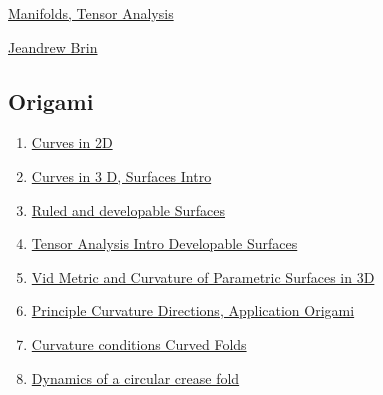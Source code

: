 \documentclass[11pt]{article}
\begin{document}
	\kaishu 
	\setcounter{section}{0}
	\begin{center}
		{\LARGE  \href{https://www.ideas4africa.co.za/manifolds}{Manifolds, Tensor Analysis}}
		
		\vspace{-0.25cm}
		
		{\large \href{https://www.ideas4africa.co.za/}{Jeandrew Brin}}
	\end{center}
\setcounter{page}{1}



\vspace{-1.5cm}

\subsection*{\large Origami}

\vspace{-0.5cm}

\begin{enumerate}
	\item \href{https://mp.weixin.qq.com/s/Kmyd83Fj94_vGyP4jXjyrg}{Curves in 2D}	%
	\item \href{https://mp.weixin.qq.com/s/QP58_2hpgKfMNF39-pXBOg}{Curves in 3 D, Surfaces Intro}	%
	\item \href{https://mp.weixin.qq.com/s/xlAYc24oIB8DhLHyYWtA9Q}{Ruled and developable Surfaces}	%
	\item \href{https://mp.weixin.qq.com/s/T-HaM710OycEOhWGGdOVCQ}{Tensor Analysis Intro Developable Surfaces}	%
	\item \href{https://mp.weixin.qq.com/s/UZqolxLyWwhfiJnNAiw2NQ}{Vid Metric and Curvature of Parametric Surfaces in 3D}	%
	\item \href{https://mp.weixin.qq.com/s/srsnqrCJqnQVUv4Y4q-neQ}{Principle Curvature Directions, Application Origami}	%
	\item \href{https://mp.weixin.qq.com/s/8dh_pg1WisPUZfnJAgXKEw}{Curvature conditions Curved Folds}	%
	\item \href{https://mp.weixin.qq.com/s/balkRILO_baFmrXVwHxYoA}{Dynamics of a circular crease fold}	%
\end{enumerate}
\end{document}

